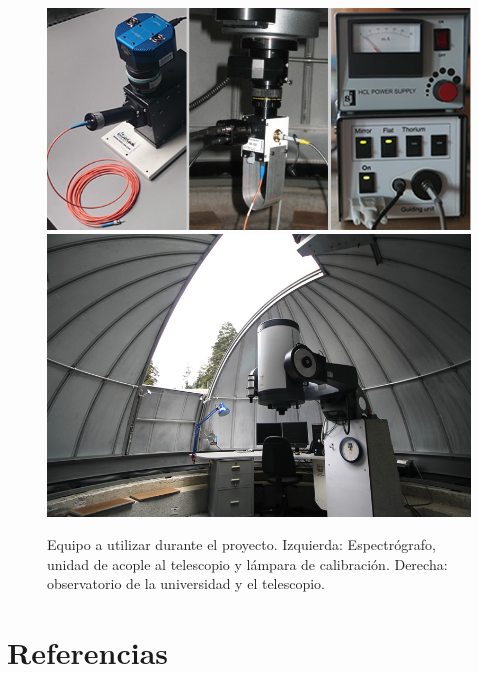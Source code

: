 \documentclass[notitlepage,letterpaper,12pt]{article} %
\begin{document}
\begin{figure}[h!]
   \includegraphics[scale= 0.6]{mosaico2.jpg} 
   \includegraphics[scale = 0.28]{IMG_9512.JPG}
  \caption{Equipo a utilizar durante el proyecto. Izquierda: Espectrógrafo, unidad de acople al telescopio y lámpara de calibración. Derecha: observatorio de la universidad y el telescopio.}
  \label{equipo}
\end{figure}










\section{Referencias}
\printbibliography[heading=none]
\end{document}
